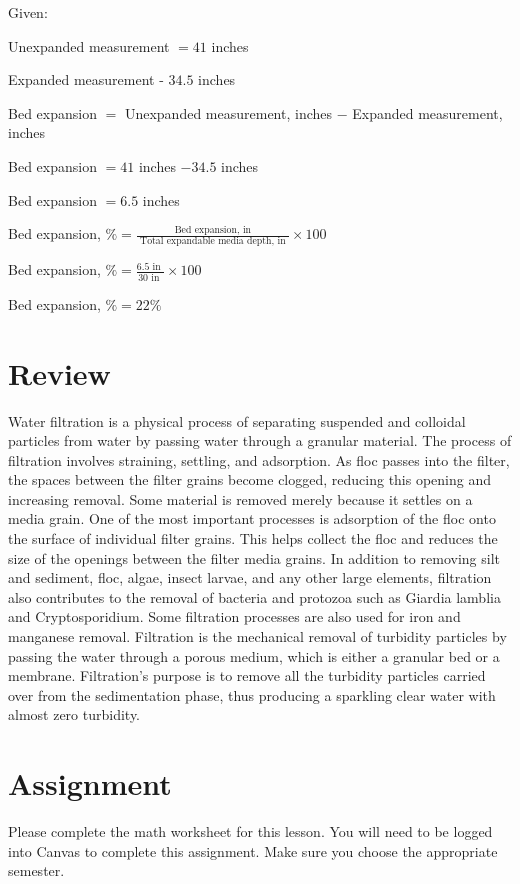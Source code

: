 \documentclass[10pt]{article}
\begin{document}
Given:

Unexpanded measurement $=41$ inches

Expanded measurement - $34.5$ inches

Bed expansion $=$ Unexpanded measurement, inches $-$ Expanded measurement, inches

Bed expansion $=41$ inches $-34.5$ inches

Bed expansion $=6.5$ inches

Bed expansion, $\%=\frac{\text { Bed expansion, in }}{\text { Total expandable media depth, in }} \times 100$

Bed expansion, $\%=\frac{6.5 \text { in }}{30 \text { in }} \times 100$

Bed expansion, $\%=22 \%$

\section{Review}
Water filtration is a physical process of separating suspended and colloidal particles from water by passing water through a granular material. The process of filtration involves straining, settling, and adsorption. As floc passes into the filter, the spaces between the filter grains become clogged, reducing this opening and increasing removal. Some material is removed merely because it settles on a media grain. One of the most important processes is adsorption of the floc onto the surface of individual filter grains. This helps collect the floc and reduces the size of the openings between the filter media grains. In addition to removing silt and sediment, floc, algae, insect larvae, and any other large elements, filtration also contributes to the removal of bacteria and protozoa such as Giardia lamblia and Cryptosporidium. Some filtration processes are also used for iron and manganese removal. Filtration is the mechanical removal of turbidity particles by passing the water through a porous medium, which is either a granular bed or a membrane. Filtration's purpose is to remove all the turbidity particles carried over from the sedimentation phase, thus producing a sparkling clear water with almost zero turbidity.

\section{Assignment}
Please complete the math worksheet for this lesson. You will need to be logged into Canvas to complete this assignment. Make sure you choose the appropriate semester.
\end{document}
